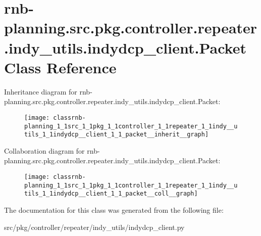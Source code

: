 \hypertarget{classrnb-planning_1_1src_1_1pkg_1_1controller_1_1repeater_1_1indy__utils_1_1indydcp__client_1_1_packet}{}\section{rnb-\/planning.src.\+pkg.\+controller.\+repeater.\+indy\+\_\+utils.\+indydcp\+\_\+client.\+Packet Class Reference}
\label{classrnb-planning_1_1src_1_1pkg_1_1controller_1_1repeater_1_1indy__utils_1_1indydcp__client_1_1_packet}


Inheritance diagram for rnb-\/planning.src.\+pkg.\+controller.\+repeater.\+indy\+\_\+utils.\+indydcp\+\_\+client.\+Packet\+:\nopagebreak
\begin{figure}[H]
\begin{center}
\leavevmode
\texttt{[image: classrnb-planning\_1\_1src\_1\_1pkg\_1\_1controller\_1\_1repeater\_1\_1indy\_\_utils\_1\_1indydcp\_\_client\_1\_1\_packet\_\_inherit\_\_graph]}
\end{center}
\end{figure}


Collaboration diagram for rnb-\/planning.src.\+pkg.\+controller.\+repeater.\+indy\+\_\+utils.\+indydcp\+\_\+client.\+Packet\+:\nopagebreak
\begin{figure}[H]
\begin{center}
\leavevmode
\texttt{[image: classrnb-planning\_1\_1src\_1\_1pkg\_1\_1controller\_1\_1repeater\_1\_1indy\_\_utils\_1\_1indydcp\_\_client\_1\_1\_packet\_\_coll\_\_graph]}
\end{center}
\end{figure}


The documentation for this class was generated from the following file\+:\begin{DoxyCompactItemize}
\item 
src/pkg/controller/repeater/indy\+\_\+utils/indydcp\+\_\+client.\+py\end{DoxyCompactItemize}
